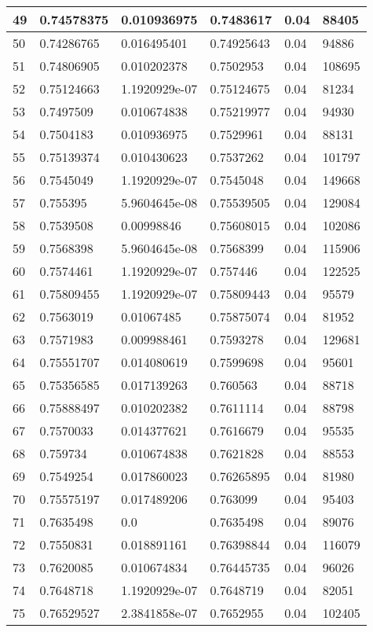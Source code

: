 \begin{longtable}{|l|l|l|l|l|l|}
49 & 0.74578375 & 0.010936975 & 0.7483617 & 0.04 & 88405 \\ \hline 
50 & 0.74286765 & 0.016495401 & 0.74925643 & 0.04 & 94886 \\ \hline 
51 & 0.74806905 & 0.010202378 & 0.7502953 & 0.04 & 108695 \\ \hline 
52 & 0.75124663 & 1.1920929e-07 & 0.75124675 & 0.04 & 81234 \\ \hline 
53 & 0.7497509 & 0.010674838 & 0.75219977 & 0.04 & 94930 \\ \hline 
54 & 0.7504183 & 0.010936975 & 0.7529961 & 0.04 & 88131 \\ \hline 
55 & 0.75139374 & 0.010430623 & 0.7537262 & 0.04 & 101797 \\ \hline 
56 & 0.7545049 & 1.1920929e-07 & 0.7545048 & 0.04 & 149668 \\ \hline 
57 & 0.755395 & 5.9604645e-08 & 0.75539505 & 0.04 & 129084 \\ \hline 
58 & 0.7539508 & 0.00998846 & 0.75608015 & 0.04 & 102086 \\ \hline 
59 & 0.7568398 & 5.9604645e-08 & 0.7568399 & 0.04 & 115906 \\ \hline 
60 & 0.7574461 & 1.1920929e-07 & 0.757446 & 0.04 & 122525 \\ \hline 
61 & 0.75809455 & 1.1920929e-07 & 0.75809443 & 0.04 & 95579 \\ \hline 
62 & 0.7563019 & 0.01067485 & 0.75875074 & 0.04 & 81952 \\ \hline 
63 & 0.7571983 & 0.009988461 & 0.7593278 & 0.04 & 129681 \\ \hline 
64 & 0.75551707 & 0.014080619 & 0.7599698 & 0.04 & 95601 \\ \hline 
65 & 0.75356585 & 0.017139263 & 0.760563 & 0.04 & 88718 \\ \hline 
66 & 0.75888497 & 0.010202382 & 0.7611114 & 0.04 & 88798 \\ \hline 
67 & 0.7570033 & 0.014377621 & 0.7616679 & 0.04 & 95535 \\ \hline 
68 & 0.759734 & 0.010674838 & 0.7621828 & 0.04 & 88553 \\ \hline 
69 & 0.7549254 & 0.017860023 & 0.76265895 & 0.04 & 81980 \\ \hline 
70 & 0.75575197 & 0.017489206 & 0.763099 & 0.04 & 95403 \\ \hline 
71 & 0.7635498 & 0.0 & 0.7635498 & 0.04 & 89076 \\ \hline 
72 & 0.7550831 & 0.018891161 & 0.76398844 & 0.04 & 116079 \\ \hline 
73 & 0.7620085 & 0.010674834 & 0.76445735 & 0.04 & 96026 \\ \hline 
74 & 0.7648718 & 1.1920929e-07 & 0.7648719 & 0.04 & 82051 \\ \hline 
75 & 0.76529527 & 2.3841858e-07 & 0.7652955 & 0.04 & 102405 \\ \hline 
\end{longtable}